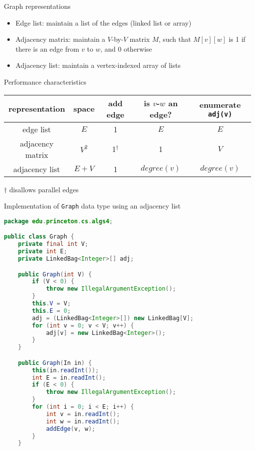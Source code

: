 \documentclass[8pt,a4paper,compress]{beamer}
\begin{document}
\begin{frame}[fragile]
\pause

Graph representations
\begin{itemize}
\item Edge list: maintain a list of the edges (linked list or array)

\item Adjacency matrix: maintain a $V$-by-$V$ matrix $M$, such that $M[v][w]$ is 1 if there is an edge from $v$ to $w$, and 0 otherwise

\item Adjacency list: maintain a vertex-indexed array of lists
\end{itemize}

\pause
\bigskip

Performance characteristics
\begin{center}
\begin{tabular}{ccccc}
representation & space & add edge & is $v$-$w$ an edge? & enumerate \lstinline$adj(v)$ \\ \hline
edge list & $E$ & 1 & $E$ & $E$ \\
adjacency matrix & $V^2$ & 1$^\dagger$ & 1 & $V$ \\ 
adjacency list & $E+V$ & 1 & $degree(v)$ & $degree(v)$ 
\end{tabular}  

\smallskip

\small $\dagger$ disallows parallel edges
\end{center}
\end{frame}

\begin{frame}[fragile]
\pause

Implementation of \lstinline{Graph} data type using an adjacency list
\begin{lstlisting}[language=java,style=focusin]
package edu.princeton.cs.algs4;

public class Graph {
    private final int V;
    private int E;
    private LinkedBag<Integer>[] adj;

    public Graph(int V) {
        if (V < 0) {
            throw new IllegalArgumentException(); 
        }
        this.V = V;
        this.E = 0;
        adj = (LinkedBag<Integer>[]) new LinkedBag[V];
        for (int v = 0; v < V; v++) {
            adj[v] = new LinkedBag<Integer>();
        }
    }

    public Graph(In in) {
        this(in.readInt());
        int E = in.readInt();
        if (E < 0) { 
            throw new IllegalArgumentException();
        }
        for (int i = 0; i < E; i++) {
            int v = in.readInt();
            int w = in.readInt();
            addEdge(v, w);
        }
    }
\end{lstlisting}
\end{frame}
\end{document}
